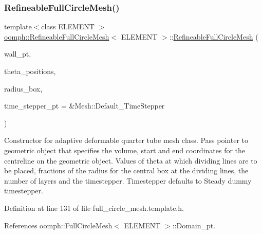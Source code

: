 \subsubsection{\texorpdfstring{Refineable\+Full\+Circle\+Mesh()}{RefineableFullCircleMesh()}}
{\footnotesize\ttfamily template$<$class E\+L\+E\+M\+E\+NT $>$ \\
\hyperlink{classoomph_1_1RefineableFullCircleMesh}{oomph\+::\+Refineable\+Full\+Circle\+Mesh}$<$ E\+L\+E\+M\+E\+NT $>$\+::\hyperlink{classoomph_1_1RefineableFullCircleMesh}{Refineable\+Full\+Circle\+Mesh} (\begin{DoxyParamCaption}\item[{Geom\+Object $\ast$}]{wall\+\_\+pt,  }\item[{const Vector$<$ double $>$ \&}]{theta\+\_\+positions,  }\item[{const Vector$<$ double $>$ \&}]{radius\+\_\+box,  }\item[{Time\+Stepper $\ast$}]{time\+\_\+stepper\+\_\+pt = {\ttfamily \&Mesh\+:\+:Default\+\_\+TimeStepper} }\end{DoxyParamCaption})\hspace{0.3cm}{\ttfamily [inline]}}



Constructor for adaptive deformable quarter tube mesh class. Pass pointer to geometric object that specifies the volume, start and end coordinates for the centreline on the geometric object. Values of theta at which dividing lines are to be placed, fractions of the radius for the central box at the dividing lines, the number of layers and the timestepper. Timestepper defaults to Steady dummy timestepper. 



Definition at line 131 of file full\+\_\+circle\+\_\+mesh.\+template.\+h.



References oomph\+::\+Full\+Circle\+Mesh$<$ E\+L\+E\+M\+E\+N\+T $>$\+::\+Domain\+\_\+pt.

\mbox{\label{classoomph_1_1RefineableFullCircleMesh_ac50b75d390504a37ecc8a86daebc78ee}} 
